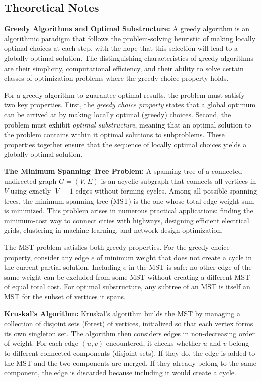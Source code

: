 ﻿\documentclass[12pt]{article}
\begin{document}
\subsection{Theoretical Notes}

\textbf{Greedy Algorithms and Optimal Substructure:} A greedy algorithm is an algorithmic paradigm that follows the problem-solving heuristic of making locally optimal choices at each step, with the hope that this selection will lead to a globally optimal solution. The distinguishing characteristics of greedy algorithms are their simplicity, computational efficiency, and their ability to solve certain classes of optimization problems where the greedy choice property holds.

For a greedy algorithm to guarantee optimal results, the problem must satisfy two key properties. First, the \textit{greedy choice property} states that a global optimum can be arrived at by making locally optimal (greedy) choices. Second, the problem must exhibit \textit{optimal substructure}, meaning that an optimal solution to the problem contains within it optimal solutions to subproblems. These properties together ensure that the sequence of locally optimal choices yields a globally optimal solution.

\textbf{The Minimum Spanning Tree Problem:} A spanning tree of a connected undirected graph $G = (V, E)$ is an acyclic subgraph that connects all vertices in $V$ using exactly $|V| - 1$ edges without forming cycles. Among all possible spanning trees, the minimum spanning tree (MST) is the one whose total edge weight sum is minimized. This problem arises in numerous practical applications: finding the minimum-cost way to connect cities with highways, designing efficient electrical grids, clustering in machine learning, and network design optimization.

The MST problem satisfies both greedy properties. For the greedy choice property, consider any edge $e$ of minimum weight that does not create a cycle in the current partial solution. Including $e$ in the MST is safe: no other edge of the same weight can be excluded from some MST without creating a different MST of equal total cost. For optimal substructure, any subtree of an MST is itself an MST for the subset of vertices it spans.

\textbf{Kruskal's Algorithm:} Kruskal's algorithm builds the MST by managing a collection of disjoint sets (forest) of vertices, initialized so that each vertex forms its own singleton set. The algorithm then considers edges in non-decreasing order of weight. For each edge $(u, v)$ encountered, it checks whether $u$ and $v$ belong to different connected components (disjoint sets). If they do, the edge is added to the MST and the two components are merged. If they already belong to the same component, the edge is discarded because including it would create a cycle.
\end{document}
